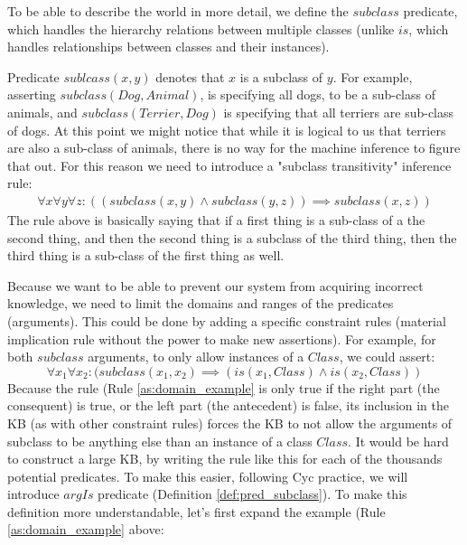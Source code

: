 To be able to describe the world in more detail, we define the $subclass$ 
predicate, which handles the hierarchy relations between multiple classes 
(unlike $is$, which handles relationships between classes and their instances).

\begin{definition}\label{def:pred_subclass}
Predicate $sublcass(x,y)$ denotes that $x$ is a subclass of $y$. For example, 
asserting $subclass(Dog, Animal)$, is specifying all dogs, to be a sub-class of
animals, and $subclass(Terrier,Dog)$ is specifying that all terriers are 
sub-class of dogs. At this point we might notice that while it is logical to us
that terriers are also a sub-class of animals, there is no way for the machine
inference to figure that out. For this reason we need to introduce a
"subclass transitivity" inference rule:
\begin{equation}\label{rule:subclass_transitivity}
\begin{gathered}
  \forall x \forall y \forall z: ((subclass(x,y) \land subclass(y,z)) \implies subclass(x,z))
\end{gathered}
\end{equation}
The rule above is basically saying that if a first thing is a sub-class of a
the second thing, and then the second thing is a subclass of the third thing,
then the third thing is a sub-class of the first thing as well. 
\end{definition}

Because we want to be able to prevent our system from acquiring incorrect 
knowledge, we need to limit the domains and ranges of the predicates 
(arguments). This could be done by adding a specific constraint rules
(material implication rule without the power to make new assertions). For 
example, for both $subclass$ arguments, to only allow instances of a $Class$, 
we could assert:
\begin{equation}\label{as:domain_example}
  \forall x_1 \forall x_2: (subclass(x_1,x_2) \implies (is(x_1,Class) \land 
  is(x_2,Class))
\end{equation}
Because the rule (Rule \ref{as:domain_example} is only true if the right part
(the consequent) is true, or the left part (the antecedent) is false, its
inclusion in the KB (as with other constraint rules) forces the KB to not allow
the arguments of subclass to be anything else than an instance of a class 
$Class$. It would be hard to construct a large KB, by writing the rule
like this for each of the thousands potential predicates. To make this easier,
following Cyc practice\parencite{Lenat1995}, we will introduce $argIs$ 
predicate (Definition \ref{def:pred_subclass}). To make this definition 
more understandable, let's
first expand the example (Rule \ref{as:domain_example} above:

